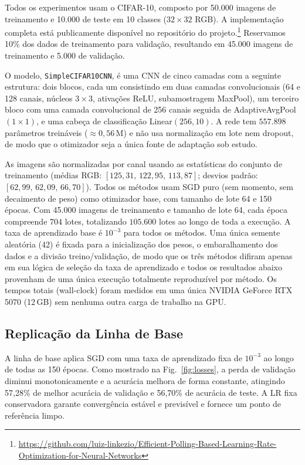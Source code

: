 \documentclass[conference]{IEEEtran}
\begin{document}
Todos os experimentos usam o CIFAR-10, composto por 50{.}000 imagens de treinamento e 10{.}000 de teste em 10 classes ($32\!\times\!32$ RGB). A implementação completa está publicamente disponível no repositório do projeto.\footnote{\url{https://github.com/luiz-linkezio/Efficient-Polling-Based-Learning-Rate-Optimization-for-Neural-Networks}} Reservamos 10\% dos dados de treinamento para validação, resultando em 45{.}000 imagens de treinamento e 5{.}000 de validação.

O modelo, \texttt{SimpleCIFAR10CNN}, é uma CNN de cinco camadas com a seguinte estrutura: dois blocos, cada um consistindo em duas camadas convolucionais (64 e 128 canais, núcleos $3\!\times\!3$, ativações ReLU, subamostragem MaxPool), um terceiro bloco com uma camada convolucional de 256 canais seguida de AdaptiveAvgPool$(1\!\times\!1)$, e uma cabeça de classificação Linear$(256, 10)$. A rede tem $557{.}898$ parâmetros treináveis ($\approx 0{,}56$\,M) e não usa normalização em lote nem dropout, de modo que o otimizador seja a única fonte de adaptação sob estudo.

As imagens são normalizadas por canal usando as estatísticas do conjunto de treinamento (médias RGB: $[125{,}31,\, 122{,}95,\, 113{,}87]$; desvios padrão: $[62{,}99,\, 62{,}09,\, 66{,}70]$). Todos os métodos usam SGD puro (sem momento, sem decaimento de peso) como otimizador base, com tamanho de lote 64 e 150 épocas. Com 45{.}000 imagens de treinamento e tamanho de lote 64, cada época compreende $704$ lotes, totalizando $105{.}600$ lotes ao longo de toda a execução. A taxa de aprendizado base é $10^{-3}$ para todos os métodos. Uma única semente aleatória (42) é fixada para a inicialização dos pesos, o embaralhamento dos dados e a divisão treino/validação, de modo que os três métodos difiram apenas em sua lógica de seleção da taxa de aprendizado e todos os resultados abaixo provenham de uma única execução totalmente reproduzível por método. Os tempos totais (wall-clock) foram medidos em uma única NVIDIA GeForce RTX 5070 (12\,GB) sem nenhuma outra carga de trabalho na GPU.

\subsection{Replicação da Linha de Base}

A linha de base aplica SGD com uma taxa de aprendizado fixa de $10^{-3}$ ao longo de todas as 150 épocas. Como mostrado na Fig.~\ref{fig:losses}, a perda de validação diminui monotonicamente e a acurácia melhora de forma constante, atingindo 57,28\% de melhor acurácia de validação e 56,70\% de acurácia de teste. A LR fixa conservadora garante convergência estável e previsível e fornece um ponto de referência limpo.
\end{document}
